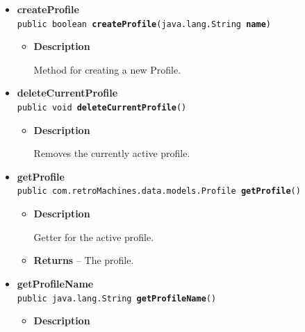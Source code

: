 \documentclass[11pt,a4paper]{report}
\begin{document}
{{{{{{{{\begin{itemize}
{\begin{itemize}
{Changes the current profile to another profile.
}
\item{
{\bf  Parameters}
  \begin{itemize}
   \item{
\texttt{profileName} -- The name of the profile that is the next active profile.}
  \end{itemize}
}%
\end{itemize}
}%
\item{ 
{\bf  createProfile}\\
\texttt{public boolean\ {\bf  createProfile}(\texttt{java.lang.String} {\bf  name})
\label{com.retroMachines.game.controllers.ProfileController.createProfile(java.lang.String)}}%
\begin{itemize}
\item{
{\bf  Description}

Method for creating a new Profile.
}
\end{itemize}
}%
\item{ 
{\bf  deleteCurrentProfile}\\
\texttt{public void\ {\bf  deleteCurrentProfile}()
\label{com.retroMachines.game.controllers.ProfileController.deleteCurrentProfile()}}%
\begin{itemize}
\item{
{\bf  Description}

Removes the currently active profile.
}
\end{itemize}
}%
\item{ 
{\bf  getProfile}\\
\texttt{public com.retroMachines.data.models.Profile\ {\bf  getProfile}()
\label{com.retroMachines.game.controllers.ProfileController.getProfile()}}%
\begin{itemize}
\item{
{\bf  Description}

Getter for the active profile.
}
\item{{\bf  Returns} -- 
The profile. 
}%
\end{itemize}
}%
\item{ 
{\bf  getProfileName}\\
\texttt{public java.lang.String\ {\bf  getProfileName}()
\label{com.retroMachines.game.controllers.ProfileController.getProfileName()}}%
\begin{itemize}
\item{
{\bf  Description}

}
\end{itemize}}
\end{itemize}}}}}}}}}
\end{document}
